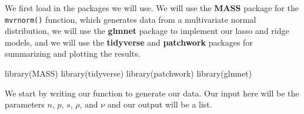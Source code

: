 \documentclass[
  letterpaper,
]{latex/krantz}
\makeatletter
\newenvironment{Shaded}{\begin{snugshade}}{\end{snugshade}}
\newcommand{\FunctionTok}[1]{\textcolor[rgb]{0.28,0.35,0.67}{#1}}
\newcommand{\NormalTok}[1]{\textcolor[rgb]{0.00,0.23,0.31}{#1}}
\newenvironment{kframe}{%
\medskip{}
\setlength{\fboxsep}{.8em}
 \def\at@end@of@kframe{}%
 \ifinner\ifhmode%
  \def\at@end@of@kframe{\end{minipage}}%
  \begin{minipage}{\columnwidth}%
 \fi\fi%
 \def\FrameCommand##1{\hskip\@totalleftmargin \hskip-\fboxsep
 \colorbox{shadecolor}{##1}\hskip-\fboxsep
     \hskip-\linewidth \hskip-\@totalleftmargin \hskip\columnwidth}%
 \MakeFramed {\advance\hsize-\width
   \@totalleftmargin\z@ \linewidth\hsize
   \@setminipage}}%
 {\par\unskip\endMakeFramed%
 \at@end@of@kframe}
\renewenvironment{Shaded}{\begin{kframe}}{\end{kframe}}
\makeatother
\begin{document}
We first load in the packages we will use. We will use the \textbf{MASS}
package for the \texttt{mvrnorm()}
function, which generates
data from a multivariate normal distribution, we will use the
\textbf{glmnet} package to implement our lasso
and ridge models, and we will use the
\textbf{tidyverse} and
\textbf{patchwork} packages for summarizing
and plotting the results.

\begin{Shaded}
\begin{Highlighting}[]
\FunctionTok{library}\NormalTok{(MASS) }
\FunctionTok{library}\NormalTok{(tidyverse) }
\FunctionTok{library}\NormalTok{(patchwork) }
\FunctionTok{library}\NormalTok{(glmnet)  }
\end{Highlighting}
\end{Shaded}

We start by writing our function to generate our data. Our input here
will be the parameters \(n\), \(p\), \(s\), \(\rho\), and \(\nu\) and
our output will be a list.
\end{document}
